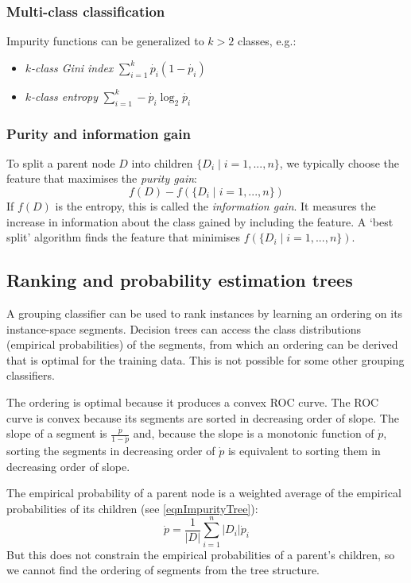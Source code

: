 \subsubsection{Multi-class classification}

Impurity functions can be generalized to $k > 2$ classes, e.g.:
\begin{itemize}
  \item \textit{$k$-class Gini index} $\sum_{i = 1}^k \dot{p_i} (1 - \dot{p_i})$
  \item \textit{$k$-class entropy} $\sum_{i = 1}^k - \dot{p_i} \log_2 \dot{p_i}$
\end{itemize}
\subsubsection{Purity and information gain}

To split a parent node $D$ into children $\{ D_i \mid i = 1, ..., n \}$, we typically choose the feature that maximises the \textit{purity gain}:
\begin{equation}
  f(D) - f(\{ D_i \mid i = 1, ..., n \})
\end{equation}
If $f(D)$ is the entropy, this is called the \textit{information gain}.
It measures the increase in information about the class gained by including the
feature.
A `best split' algorithm finds the feature that minimises $f(\{ D_i \mid i = 1,
  ..., n \})$.

\subsection{Ranking and probability estimation trees}

A grouping classifier can be used to rank instances by learning an ordering on
its instance-space segments.
Decision trees can access the class distributions (empirical probabilities) of
the segments, from which an ordering can be derived that is optimal for the
training data.
This is not possible for some other grouping classifiers.

The ordering is optimal because it produces a convex ROC curve.
The ROC curve is convex because its segments are sorted in decreasing order of
slope.
The slope of a segment is $\frac{\dot{p}}{1 - \dot{p}}$ and, because the slope
is a monotonic function of $\dot{p}$, sorting the segments in decreasing order
of $\dot{p}$ is equivalent to sorting them in decreasing order of slope.

The empirical probability of a parent node is a weighted average of the empirical probabilities of its children (see \ref{eqnImpurityTree}):
\begin{equation}
  \dot{p} =  \frac{1}{|D|} \sum_{i = 1}^{n} |D_i| \dot{p}_i
\end{equation}
But this does not constrain the empirical probabilities of a parent's children,
so we cannot find the ordering of segments from the tree structure.

